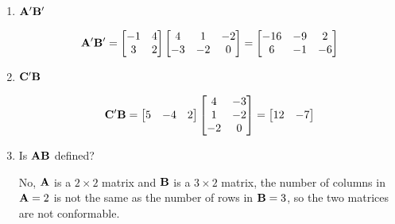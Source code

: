 \begin{enumerate}[font=\bfseries]
\begin{enumerate}
            \item $\bold{A}^\prime \bold{B}^\prime$
            

            \[
                \bold{A}^\prime \bold{B}^\prime =
                \begin{bmatrix}
                    -1 & 4 \\
                    3 & 2
                \end{bmatrix}
                \begin{bmatrix}
                    4 & 1 & -2 \\
                    -3 & -2 & 0
                \end{bmatrix} = 
                \begin{bmatrix}
                    -16 & -9 & 2 \\
                    6 & -1 & -6
                \end{bmatrix}
            \]


            \item $\bold{C}^\prime \bold{B}$
            

            \[
                \bold{C}^\prime \bold{B} =
                \begin{bmatrix}
                    5 & -4 & 2
                \end{bmatrix}
                \begin{bmatrix}
                    4  & -3 \\
                    1  & -2 \\
                    -2 &  0
                \end{bmatrix} =
                \begin{bmatrix}
                    12  & -7
                \end{bmatrix}
            \]


            \item Is $\bold{AB}$ defined?
            

            No, $\bold{A}$ is a $2 \times 2$ matrix and $\bold{B}$ is a $3 \times 2$ matrix, the number of columns in $\bold{A} = 2$ is not the same as the number of rows in $\bold{B} = 3$, so the two matrices are not conformable.



\end{enumerate}
\end{enumerate}
